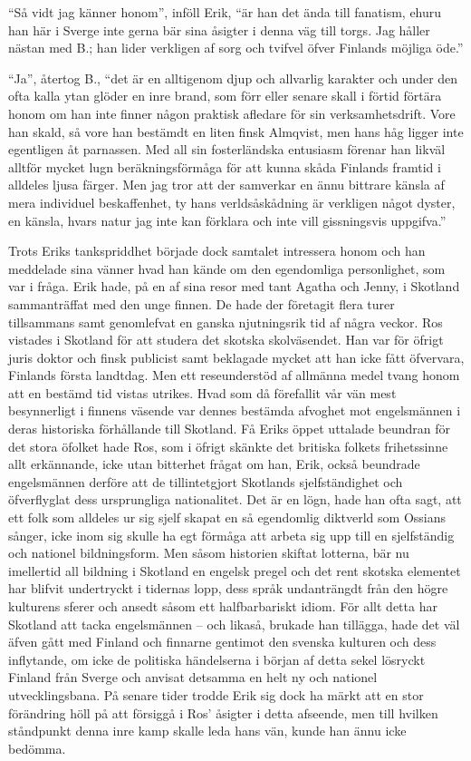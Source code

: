``Så vidt jag känner honom'', inföll Erik, ``är han det ända till
fanatism, ehuru han här i Sverge inte gerna bär sina åsigter i denna väg
till torgs. Jag håller nästan med B.; han lider verkligen af sorg och
tvifvel öfver Finlands möjliga öde.''

``Ja'', återtog B., ``det är en alltigenom djup och allvarlig karakter
och under den ofta kalla ytan glöder en inre brand, som förr eller
senare skall i förtid förtära honom om han inte finner någon praktisk
afledare för sin verksamhetsdrift. Vore han skald, så vore han bestämdt
en liten finsk Almqvist, men hans håg ligger inte egentligen åt
parnassen. Med all sin fosterländska entusiasm förenar han likväl
alltför mycket lugn beräkningsförmåga för att kunna skåda Finlands
framtid i alldeles ljusa färger. Men jag tror att der samverkar en ännu
bittrare känsla af mera individuel beskaffenhet, ty hans verldsåskådning
är verkligen något dyster, en känsla, hvars natur jag inte kan förklara
och inte vill gissningsvis uppgifva.''

Trots Eriks tankspriddhet började dock samtalet intressera honom och han
meddelade sina vänner hvad han kände om den egendomliga personlighet,
som var i fråga. Erik hade, på en af sina resor med tant Agatha och
Jenny, i Skotland sammanträffat med den unge finnen. De hade der
företagit flera turer tillsammans samt genomlefvat en ganska
njutningsrik tid af några veckor. Ros vistades i Skotland för att
studera det skotska skolväsendet. Han var för öfrigt juris doktor och
finsk publicist samt beklagade mycket att han icke fått öfvervara,
Finlands första landtdag. Men ett reseunderstöd af allmänna medel tvang
honom att en bestämd tid vistas utrikes. Hvad som då förefallit vår vän
mest besynnerligt i finnens väsende var dennes bestämda afvoghet mot
engelsmännen i deras historiska förhållande till Skotland. Få Eriks
öppet uttalade beundran för det stora öfolket hade Ros, som i öfrigt
skänkte det britiska folkets frihetssinne allt erkännande, icke utan
bitterhet frågat om han, Erik, också beundrade engelsmännen derföre att
de tillintetgjort Skotlands sjelfständighet och öfverflyglat dess
ursprungliga nationalitet. Det är en lögn, hade han ofta sagt, att ett
folk som alldeles ur sig sjelf skapat en så egendomlig diktverld som
Ossians sånger, icke inom sig skulle ha egt förmåga att arbeta sig upp
till en sjelfständig och nationel bildningsform. Men såsom historien
skiftat lotterna, bär nu imellertid all bildning i Skotland en engelsk
pregel och det rent skotska elementet har blifvit undertryckt i tidernas
lopp, dess språk undanträngdt från den högre kulturens sferer och ansedt
såsom ett halfbarbariskt idiom. För allt detta har Skotland att tacka
engelsmännen -- och likaså, brukade han tillägga, hade det väl äfven
gått med Finland och finnarne gentimot den svenska kulturen och dess
inflytande, om icke de politiska händelserna i början af detta sekel
lösryckt Finland från Sverge och anvisat detsamma en helt ny och
nationel utvecklingsbana. På senare tider trodde Erik sig dock ha märkt
att en stor förändring höll på att försiggå i Ros' åsigter i detta
afseende, men till hvilken ståndpunkt denna inre kamp skalle leda hans
vän, kunde han ännu icke bedömma.

